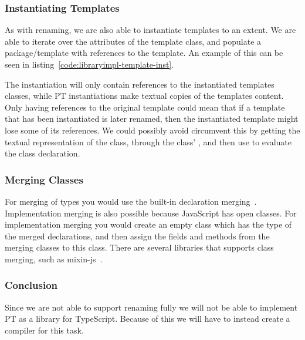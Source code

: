\subsubsection{Instantiating Templates}\label{subsubsec:instantiating-templates}

As with renaming, we are also able to instantiate templates to an extent.
We are able to iterate over the attributes of the template class, and populate a package/template with references to the template.
An example of this can be seen in listing~\vref{code:libraryimpl-template-inst}.


The instantiation will only contain references to the instantiated templates classes, while PT instantiations make textual copies of the templates content.
Only having references to the original template could mean that if a template that has been instantiated is later renamed, then the instantiated template might lose some of its references.
We could possibly avoid circumvent this by getting the textual representation of the class, through the class' , and then use  to evaluate the class declaration.

\subsubsection{Merging Classes}

For merging of types you would use the built-in declaration merging~\cite{declerationmerging}.
Implementation merging is also possible because JavaScript has open classes.
For implementation merging you would create an empty class which has the type of the merged declarations, and then assign the fields and methods from the merging classes to this class.
There are several libraries that supports class merging, such as mixin-js~\cite{mixinjs}.

\subsubsection{Conclusion}

Since we are not able to support renaming fully we will not be able to implement PT as a library for TypeScript.
Because of this we will have to instead create a compiler for this task.
